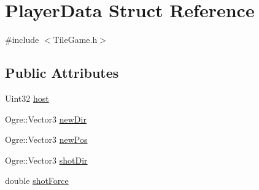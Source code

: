 \hypertarget{structPlayerData}{\section{Player\-Data Struct Reference}
\label{structPlayerData}
}


{\ttfamily \#include $<$Tile\-Game.\-h$>$}

\subsection*{Public Attributes}
\begin{DoxyCompactItemize}
\item 
Uint32 \hyperlink{structPlayerData_afedaac99a073198e7347fb41df68bbdf}{host}
\item 
Ogre\-::\-Vector3 \hyperlink{structPlayerData_a24adab3caa5143343ef885fc71c449de}{new\-Dir}
\item 
Ogre\-::\-Vector3 \hyperlink{structPlayerData_ab63193631eb26d16924e7b81aab109be}{new\-Pos}
\item 
Ogre\-::\-Vector3 \hyperlink{structPlayerData_acab3f24dcc83136321f31dd719fb855e}{shot\-Dir}
\item 
double \hyperlink{structPlayerData_a793f89049e5fbf15cefe903487a56265}{shot\-Force}
\end{DoxyCompactItemize}


